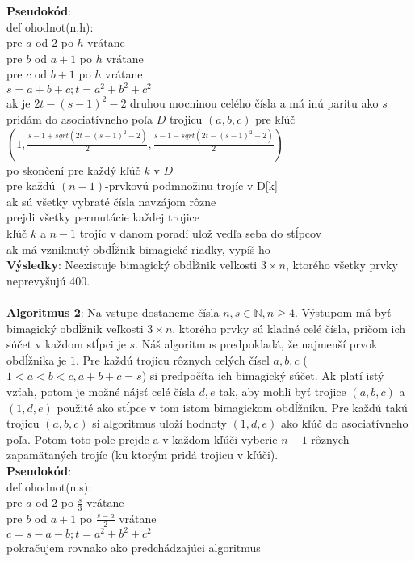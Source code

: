 \documentclass[12pt]{article}
\begin{document}
\textbf{Pseudokód}: \\
def ohodnot(n,h): \\
pre $a$ od $2$ po $h$ vrátane \\
pre $b$ od $a+1$ po $h$ vrátane \\
pre $c$ od $b+1$ po $h$ vrátane \\
$s = a+b+c; t = a^2+b^2+c^2$ \\
ak je $2t - (s-1)^2 - 2$ druhou mocninou celého čísla a má inú paritu ako $s$ \\
pridám do asociatívneho poľa $D$ trojicu $(a,b,c)$ pre kľúč $(1, \frac{s-1 + sqrt(2t - (s-1)^2 - 2)}{2}, \frac{s-1 - sqrt(2t - (s-1)^2 - 2)}{2})$ \\
po skončení pre každý kľúč $k$ v $D$ \\
pre každú $(n-1)$-prvkovú podmnožinu trojíc v D[k] \\
ak sú všetky vybraté čísla navzájom rôzne \\
prejdi všetky permutácie každej trojice \\
kľúč $k$ a $n-1$ trojíc v danom poradí ulož vedľa seba do stĺpcov \\
ak má vzniknutý obdĺžnik bimagické riadky, vypíš ho \\

\textbf{Výsledky}: Neexistuje bimagický obdĺžnik veľkosti $3 \times n$, ktorého všetky prvky neprevyšujú $400$. \\\\

\textbf{Algoritmus 2}: Na vstupe dostaneme čísla $n,s \in \mathbb{N}, n \geq 4$. Výstupom má byť bimagický obdĺžnik veľkosti $3 \times n$, ktorého prvky sú kladné celé čísla, pričom ich súčet v každom stĺpci je $s$. Náš algoritmus predpokladá, že najmenší prvok obdĺžnika je $1$. Pre každú trojicu rôznych celých čísel $a,b,c$ ($1 < a < b < c, a+b+c = s$) si predpočíta ich bimagický súčet. Ak platí istý vzťah, potom je možné nájsť celé čísla $d,e$ tak, aby mohli byť trojice $(a,b,c)$ a $(1,d,e)$ použité ako stĺpce v tom istom bimagickom obdĺžniku. Pre každú takú trojicu $(a,b,c)$ si algoritmus uloží hodnoty $(1,d,e)$ ako kľúč do asociatívneho poľa. Potom toto pole prejde a v každom kľúči vyberie $n-1$ rôznych zapamätaných trojíc (ku ktorým pridá trojicu v kľúči). \\

\textbf{Pseudokód}: \\
def ohodnot(n,s): \\
pre $a$ od $2$ po $\frac{s}{3}$ vrátane \\
pre $b$ od $a+1$ po $\frac{s-a}{2}$ vrátane \\
$c = s-a-b; t = a^2+b^2+c^2$ \\
pokračujem rovnako ako predchádzajúci algoritmus \\
\end{document}
